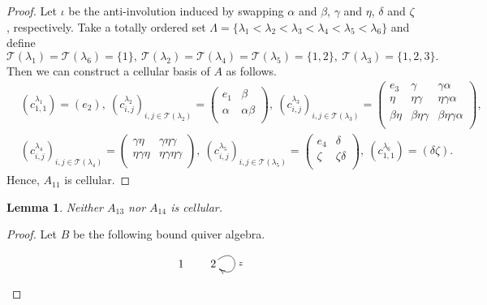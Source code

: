 \documentclass[12pt]{amsart}
\newtheorem{lem}[thm]{Lemma}
\numberwithin{equation}{thm}
\newcommand\cT{\mathcal{T}}
\newcommand\la{\lambda}
\begin{document}
{\begin{proof}
Let $\iota$ be the anti-involution induced by swapping 
$\alpha$ and $\beta$, $\gamma$ and $\eta$, $\delta$ and $\zeta$, respectively.
Take a totally ordered set
 $\Lambda=
 \{\lambda_1<\lambda_2<\lambda_3<\lambda_4<\lambda_5<\lambda_6\}$ and define
\[\cT(\lambda_1)=\cT(\lambda_6)=\{1\},\ \cT(\lambda_2)=\cT(\lambda_4)=\cT(\lambda_5)=\{1,2\},\
\cT(\lambda_3)=\{1,2,3\}.\]
Then we can construct a cellular basis of $A$ as follows.
\begin{align*}
& (c_{1,1}^{\lambda_1})=(e_2),\  
  (c_{i,j}^{\lambda_2})_{i,j\in \cT(\la_2)}
    =\begin{pmatrix}
    e_1 & \beta \\
    \alpha & \alpha\beta \\
    \end{pmatrix},\ 
 (c_{i,j}^{\lambda_3})_{i,j\in \cT(\la_3)}
    =\begin{pmatrix}
    e_3 & \gamma & \gamma\alpha \\
    \eta & \eta\gamma & \eta\gamma\alpha \\
    \beta\eta & \beta\eta\gamma & \beta\eta\gamma\alpha \\
    \end{pmatrix},\\[7pt]   
& (c_{i,j}^{\lambda_4})_{i,j\in \cT(\la_4)}
    =\begin{pmatrix}
    \gamma\eta & \gamma\eta\gamma \\
    \eta\gamma\eta & \eta\gamma\eta\gamma \\
    \end{pmatrix},\ 
 (c_{i,j}^{\lambda_5})_{i,j\in \cT(\la_5)}
    =\begin{pmatrix}
    e_4 & \delta \\
    \zeta & \zeta\delta \\
    \end{pmatrix},\ 
 (c_{1,1}^{\lambda_6})=(\delta\zeta).
 \end{align*}
Hence, $A_{11}$ is cellular.
 \end{proof}
\begin{lem}
\label{P A13A14}
Neither $A_{13}$ nor $A_{14}$ is cellular.
\end{lem}
\begin{proof}
Let $B$ be the following bound quiver algebra.
\[\begin{xy}
(0,0) *[o]+{1}="A", (10,0) *[o]+{2}="B",
\ar @(ru,rd) "B";"B"^{z}

\end{xy}\]
\end{proof}}
\end{document}
